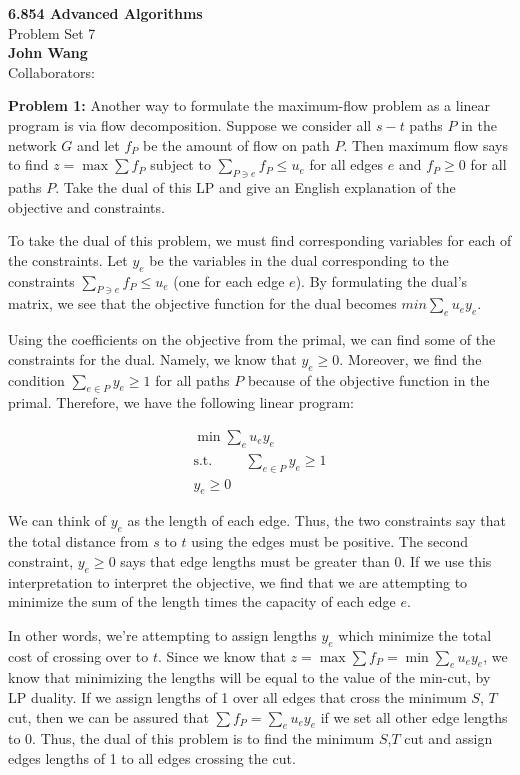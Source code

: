 \documentclass[psamsfonts]{amsart}
\newenvironment{sol}{\vspace{0.25cm}{\large \bfseries Solution:}}{\qedsymbol}
\newenvironment{prob}[1]{\begin{framed}{\large \bfseries Problem #1:}}{\end{framed}}
\newcommand{\makenewtitle}{
    \begin{center}
    {\huge \bfseries 6.854 Advanced Algorithms} \\
    Problem Set 7\\
    \vspace{0.25cm}
    {\bfseries John Wang} \\
    Collaborators: 
    \end{center}
    \vspace{0.5cm}
}
\begin{document}
\makenewtitle

\begin{prob}{1}
Another way to formulate the maximum-flow problem as a linear program is via flow decomposition. Suppose we consider all $s-t$ paths $P$ in the network $G$ and let $f_P$ be the amount of flow on path $P$. Then maximum flow says to find $z = \max \sum f_P$ subject to $\sum_{P \ni e} f_P \leq u_e$ for all edges $e$ and $f_P \geq 0$ for all paths $P$. Take the dual of this LP and give an English explanation of the objective and constraints.
\end{prob}

\begin{sol}
To take the dual of this problem, we must find corresponding variables for each of the constraints. Let $y_{e}$ be the variables in the dual corresponding to the constraints $\sum_{P \ni e} f_P \leq u_e$ (one for each edge $e$). By formulating the dual's matrix, we see that the objective function for the dual becomes $min \sum_{e} u_e y_e$. 

Using the coefficients on the objective from the primal, we can find some of the constraints for the dual. Namely, we know that $y_e \geq 0$. Moreover, we find the condition $\sum_{e \in P} y_e \geq 1$ for all paths $P$ because of the objective function in the primal. Therefore, we have the following linear program:

\begin{eqnarray}
\min \sum_e u_e y_e \\
\text{s.t.} \hspace{1cm} \sum_{e \in P} y_e \geq 1 \\
y_e \geq 0
\end{eqnarray}

We can think of $y_e$ as the length of each edge. Thus, the two constraints say that the total distance from $s$ to $t$ using the edges must be positive. The second constraint, $y_e \geq 0$ says that edge lengths must be greater than 0. If we use this interpretation to interpret the objective, we find that we are attempting to minimize the sum of the length times the capacity of each edge $e$. 

In other words, we're attempting to assign lengths $y_e$ which minimize the total cost of crossing over to $t$. Since we know that $z = \max \sum f_P = \min \sum_{e} u_e y_e$, we know that minimizing the lengths will be equal to the value of the min-cut, by LP duality. If we assign lengths of 1 over all edges that cross the minimum $S$, $T$ cut, then we can be assured that $\sum f_P = \sum_{e} u_e y_e$ if we set all other edge lengths to 0. Thus, the dual of this problem is to find the minimum $S$,$T$ cut and assign edges lengths of 1 to all edges crossing the cut. 
\end{sol}
\end{document}
